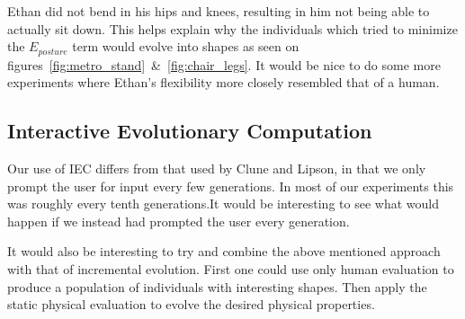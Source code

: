 Ethan did not bend in his hips and knees, resulting in him not being able to 
actually sit down. This helps explain why the individuals which tried to 
minimize the $E_{posture}$ term would evolve into shapes as seen on
figures~\ref{fig:metro_stand}~\&~\ref{fig:chair_legs}. It would be nice to do 
some more experiments where Ethan's flexibility more closely resembled that of 
a human.

\subsection{Interactive Evolutionary Computation}
Our use of IEC differs from that used by Clune and 
Lipson\cite{Clune:2011:EOG:2078245.2078246}, in that we only prompt the user 
for input every few generations. In most of our experiments this was roughly 
every tenth generations.It would be interesting to see what would happen if we 
instead had prompted the user every generation. 

It would also be interesting to try and combine the above mentioned approach 
with that of incremental evolution. First one could use only human evaluation 
to produce a population of individuals with interesting shapes. Then apply the 
static physical evaluation to evolve the desired physical properties.
